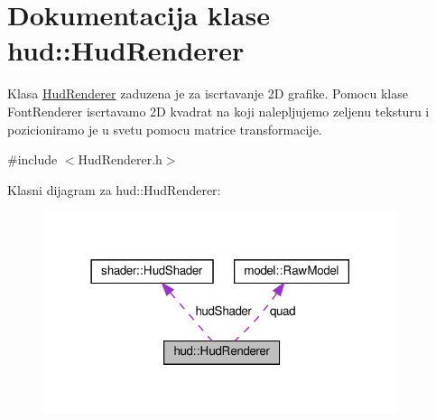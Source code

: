 \hypertarget{classhud_1_1HudRenderer}{}\section{Dokumentacija klase hud\+:\+:Hud\+Renderer}
\label{classhud_1_1HudRenderer}


Klasa \hyperlink{classhud_1_1HudRenderer}{Hud\+Renderer} zaduzena je za iscrtavanje 2D grafike. Pomocu klase Font\+Renderer iscrtavamo 2D kvadrat na koji nalepljujemo zeljenu teksturu i pozicioniramo je u svetu pomocu matrice transformacije.  




{\ttfamily \#include $<$Hud\+Renderer.\+h$>$}



Klasni dijagram za hud\+:\+:Hud\+Renderer\+:
\nopagebreak
\begin{figure}[H]
\begin{center}
\leavevmode
\includegraphics[width=294pt]{classhud_1_1HudRenderer__coll__graph}
\end{center}
\end{figure}
